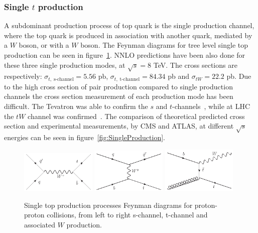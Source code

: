 
\subsubsection{Single $t$ production}
\label{subsec:topsing}

A subdominant production process of top quark is the single production channel, where the top quark is produced in association with another quark, mediated by a $W$ boson, or with a $W$ boson. The Feynman diagrams for tree level single top production can be seen in figure~\ref{fig:SingleProductionFD}. NNLO predictions have been also done for these three single production modes, at $\sqrt{s}=8$ TeV. The cross sections are respectively: $\sigma_{t,\; \text{s-channel}}=5.56$ pb, $\sigma_{t,\; \text{t-channel}}=84.34$ pb and $\sigma_{tW}=22.2$ pb. Due to the high cross section of pair production compared to single production channels the cross section measurement of each production mode has been difficult. The Tevatron was able to confirm the $s$ and $t$-channels~\cite{Aaltonen:2009jj}, while at LHC the $tW$ channel was confirmed~\cite{Chatrchyan:1642680}. The comparison of theoretical predicted cross section and experimental measurements, by CMS and ATLAS, at different $\sqrt{s}$ energies can be seen in figure~\ref{fig:SingleProduction}.

\begin{figure}[!Hhtbp]
  \begin{center}
    \includegraphics[width=0.32\textwidth]{figs/Schannel_top_single.jpg}
    \includegraphics[width=0.32\textwidth]{figs/Tchannel_top_single.jpg}
    \includegraphics[width=0.32\textwidth]{figs/TWchannel_top_single.jpg}
    \caption{Single top production processes Feynman diagrams for proton-proton collisions, from left to right s-channel, t-channel and associated $W$ production.}
    \label{fig:SingleProductionFD}
  \end{center}
\end{figure}

